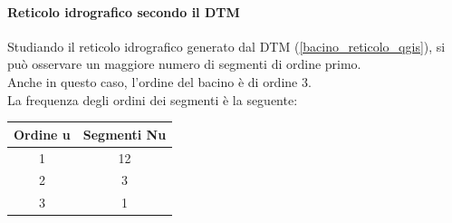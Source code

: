 \paragraph{Reticolo idrografico secondo il DTM}
Studiando il reticolo idrografico generato dal DTM (\ref{bacino_reticolo_qgis}), si può osservare un maggiore numero di segmenti di ordine primo.\\
Anche in questo caso, l'ordine del bacino è di ordine 3.\\
La frequenza degli ordini dei segmenti è la seguente:
\begin{table}[H] \centering
    \begin{tabular}{cc}
\toprule
    Ordine u & Segmenti Nu \\
\midrule    
    1        & 12          \\
    2        & 3          \\
    3        & 1           \\
\bottomrule    
\end{tabular}
\end{table}

